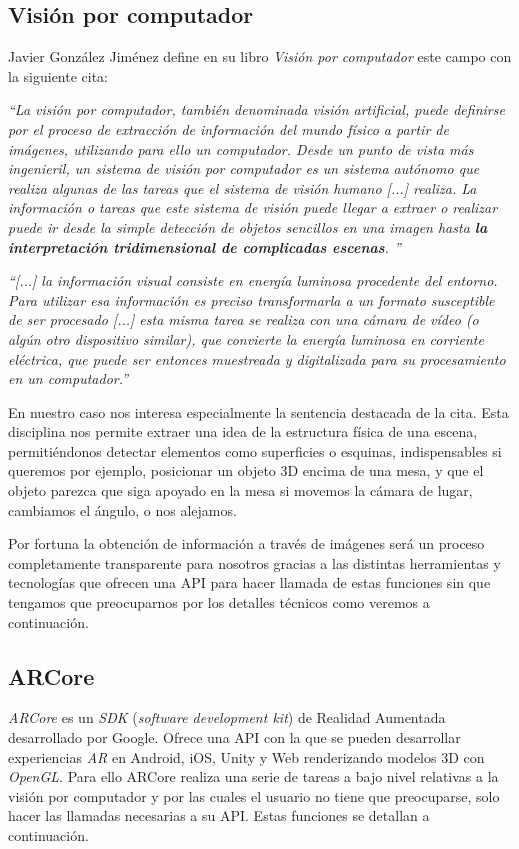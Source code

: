 \subsection{Visión por computador}
Javier González Jiménez define en su libro \textit{Visión por computador}\cite{visioncomputador} este campo con la siguiente cita:


    \textit{``La visión por computador, también denominada visión artificial, puede definirse por el proceso de extracción de información del mundo físico a partir de imágenes, utilizando para ello un computador. Desde un punto de vista más ingenieril, un sistema de visión por computador es un sistema autónomo que realiza algunas de las tareas que el sistema de visión humano [...] realiza. La información o tareas que este sistema de visión puede llegar a extraer o realizar puede ir desde la simple detección de objetos sencillos en una imagen hasta \textbf{la interpretación tridimensional de complicadas escenas}.
    ''}

    \textit{``[...] la información visual consiste en energía luminosa procedente del entorno. Para utilizar esa información es preciso transformarla a un formato susceptible de ser procesado [...] esta misma tarea se realiza con una cámara de vídeo (o algún otro dispositivo similar), que convierte la energía luminosa en corriente eléctrica, que puede ser entonces muestreada y digitalizada para su procesamiento en un computador.''}

En nuestro caso nos interesa especialmente la sentencia destacada de la cita. Esta disciplina nos permite extraer una idea de la estructura física de una escena, permitiéndonos detectar elementos como superficies o esquinas, indispensables si queremos por ejemplo, posicionar un objeto 3D encima de una mesa, y que el objeto parezca que siga apoyado en la mesa si movemos la cámara de lugar, cambiamos el ángulo, o nos alejamos.

Por fortuna la obtención de información a través de imágenes será un proceso completamente transparente para nosotros gracias a las distintas herramientas y tecnologías que ofrecen una API para hacer llamada de estas funciones sin que tengamos que preocuparnos por los detalles técnicos como veremos a continuación.

\subsection{ARCore}
\textit{ARCore}\cite{arcore}  es un \textit{SDK} (\textit{software development kit}) de Realidad Aumentada desarrollado por Google. Ofrece una API con la que se pueden desarrollar experiencias \textit{AR} en Android, iOS, Unity y Web renderizando modelos 3D con \textit{OpenGL}. Para ello ARCore realiza una serie de tareas a bajo nivel relativas a la visión por computador y por las cuales el usuario no tiene que preocuparse, solo hacer las llamadas necesarias a su API. Estas funciones se detallan a continuación.


